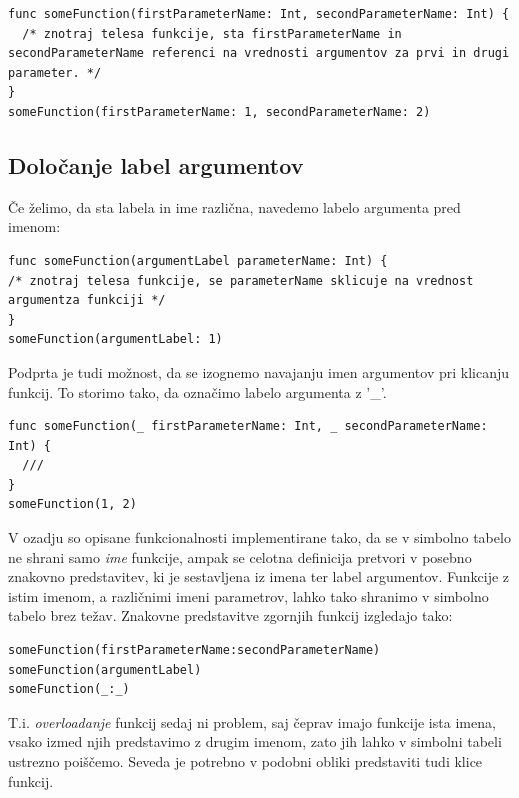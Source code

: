 \documentclass[a4paper, 12p]{book}
\begin{document}
\begin{lstlisting}[caption={Primer definicije in klica funkcije}, captionpos=b]
func someFunction(firstParameterName: Int, secondParameterName: Int) {
  /* znotraj telesa funkcije, sta firstParameterName in secondParameterName referenci na vrednosti argumentov za prvi in drugi parameter. */
}
someFunction(firstParameterName: 1, secondParameterName: 2)
\end{lstlisting}

\subsection{Določanje label argumentov}

Če želimo, da sta labela in ime različna, navedemo labelo argumenta pred imenom:

\begin{lstlisting}[caption={Labela argumenta in ime parametra se razlikujeta}, captionpos=b]
func someFunction(argumentLabel parameterName: Int) {
/* znotraj telesa funkcije, se parameterName sklicuje na vrednost argumentza funkciji */
}
someFunction(argumentLabel: 1) 
\end{lstlisting}

Podprta je tudi možnost, da se izognemo navajanju imen argumentov pri klicanju funkcij. To storimo tako, da označimo labelo argumenta z '\_'.

\begin{lstlisting}[caption={}, captionpos=b]
func someFunction(_ firstParameterName: Int, _ secondParameterName: Int) {
  ///
}
someFunction(1, 2)
\end{lstlisting}

V ozadju so opisane funkcionalnosti implementirane tako, da se v simbolno tabelo ne shrani samo \textit{ime} funkcije, ampak se celotna definicija pretvori v posebno znakovno predstavitev, ki je sestavljena iz imena ter label argumentov. Funkcije z istim imenom, a različnimi imeni parametrov, lahko tako shranimo v simbolno tabelo brez težav. Znakovne predstavitve zgornjih funkcij izgledajo tako:

\begin{lstlisting}[caption={Znakovne predstavitve funkcij}, captionpos=b]
someFunction(firstParameterName:secondParameterName)
someFunction(argumentLabel)
someFunction(_:_)
\end{lstlisting}

T.i. \textit{overloadanje} funkcij sedaj ni problem, saj čeprav imajo funkcije ista imena, vsako izmed njih predstavimo z drugim imenom, zato jih lahko v simbolni tabeli ustrezno poiščemo. Seveda je potrebno v podobni obliki predstaviti tudi klice funkcij.
\end{document}
